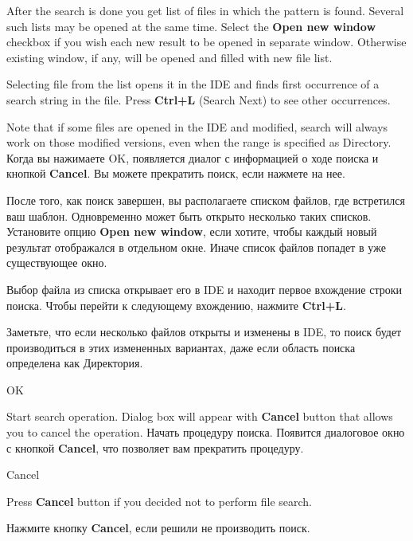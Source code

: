 After the search is done you get list of files in which the pattern is found.
Several such lists may be opened at the same time. Select the {\bf Open new window}
checkbox if you wish each new result to be opened in separate window. Otherwise
existing window, if any, will be opened and filled with new file list.

Selecting file from the list opens it in the IDE and finds first occurrence of
a search string in the file. Press {\bf Ctrl+L} (Search Next) to see other occurrences.

Note that if some files are opened in the IDE and modified, search will always
work on those modified versions, even when the range is specified as Directory.
\else
Когда вы нажимаете OK, появляется диалог с информацией о ходе поиска и кнопкой
{\bf Cancel}. Вы можете прекратить поиск, если нажмете на нее.

После того, как поиск завершен, вы располагаете списком файлов, где встретился 
ваш шаблон. Одновременно может быть открыто несколько таких списков. Установите 
опцию {\bf Open new window}, если хотите, чтобы каждый новый результат отображался 
в отдельном окне. Иначе список файлов попадет в уже существующее окно. 

Выбор файла из списка открывает его в IDE и находит первое вхождение
строки поиска. Чтобы перейти к следующему вхождению, нажмите {\bf Ctrl+L}.

Заметьте, что если несколько файлов открыты и изменены в IDE, то поиск будет
производиться в этих измененных вариантах, даже если область поиска определена 
как Директория.
\fi

\begin{popup}
\caption{OK}

\ifenglish
Start search operation. Dialog box will appear with {\bf Cancel} button
that allows you to cancel the operation.
\else
Начать процедуру поиска. Появится диалоговое окно с кнопкой {\bf Cancel},
что позволяет вам прекратить процедуру.
\fi
\end{popup}

\begin{popup}
\caption{Cancel}

\ifenglish
Press {\bf Cancel} button if you decided not to perform file search.

\else
Нажмите кнопку {\bf Cancel}, если решили не производить поиск.
\fi
\end{popup}

